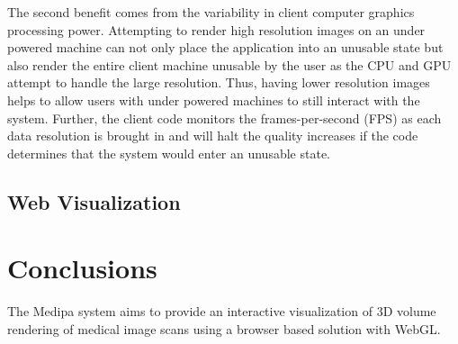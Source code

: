 \documentclass{acm_proc_article-sp}
\begin{document}
The second benefit comes from the variability in client computer graphics processing power.  Attempting to render high resolution images on an under powered machine can not only place the application into an unusable state but also render the entire client machine unusable by the user as the CPU and GPU attempt to handle the large resolution.  Thus, having lower resolution images helps to allow users with under powered machines to still interact with the system.  Further, the client code monitors the frames-per-second (FPS) as each data resolution is brought in and will halt the quality increases if the code determines that the system would enter an unusable state.


\subsection{Web Visualization}

\section{Conclusions}
The Medipa system aims to provide an interactive visualization of 3D volume rendering of medical image scans using a browser based solution with WebGL.

%

%
%
\appendix
\section{}


\balancecolumns
\end{document}
